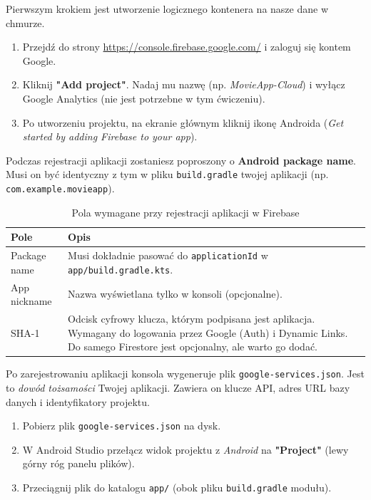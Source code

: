 Pierwszym krokiem jest utworzenie logicznego kontenera na nasze dane w chmurze.

\begin{enumerate}
    \item Przejdź do strony \url{https://console.firebase.google.com/} i zaloguj się kontem Google.
    \item Kliknij \textbf{"Add project"}. Nadaj mu nazwę (np. \textit{MovieApp-Cloud}) i wyłącz Google Analytics (nie jest potrzebne w tym ćwiczeniu).
    \item Po utworzeniu projektu, na ekranie głównym kliknij ikonę Androida (\textit{Get started by adding Firebase to your app}).
\end{enumerate}

Podczas rejestracji aplikacji zostaniesz poproszony o \textbf{Android package name}. Musi on być identyczny z tym w pliku \texttt{build.gradle} twojej aplikacji (np. \texttt{com.example.movieapp}).

\begin{table}[h]
\centering
\begin{tabular}{|l|p{10cm}|}
\hline
\textbf{Pole} & \textbf{Opis} \\ \hline
Package name & Musi dokładnie pasować do \texttt{applicationId} w \texttt{app/build.gradle.kts}. \\ \hline
App nickname & Nazwa wyświetlana tylko w konsoli (opcjonalne). \\ \hline
SHA-1 & Odcisk cyfrowy klucza, którym podpisana jest aplikacja. Wymagany do logowania przez Google (Auth) i Dynamic Links. Do samego Firestore jest opcjonalny, ale warto go dodać. \\ \hline
\end{tabular}
\caption{Pola wymagane przy rejestracji aplikacji w Firebase}
\end{table}

Po zarejestrowaniu aplikacji konsola wygeneruje plik \texttt{google-services.json}. Jest to \textit{dowód tożsamości} Twojej aplikacji. Zawiera on klucze API, adres URL bazy danych i identyfikatory projektu.

\begin{enumerate}
    \item Pobierz plik \texttt{google-services.json} na dysk.
    \item W Android Studio przełącz widok projektu z \textit{Android} na \textbf{"Project"} (lewy górny róg panelu plików).
    \item Przeciągnij plik do katalogu \texttt{app/} (obok pliku \texttt{build.gradle} modułu).
\end{enumerate}

